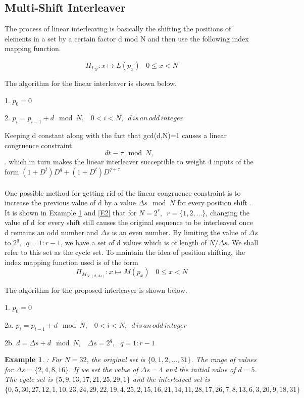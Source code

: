 \documentclass[20 pts]{article}
\newtheorem{example}[theorem]{Example}
\begin{document}
 \subsection{Multi-Shift Interleaver}
 The process of linear interleaving is basically the shifting the positions of elements in
 a set by a certain factor d mod N and then use the following index mapping function.
 
 $$\Pi_{\mathit{L}_{N}} : x \mapsto L(p_x)\,\,\,\,\, 0\leq x<N$$
 
 The algorithm for the linear interleaver is shown below.
  
   1. $p_0=0$
 
  2. $p_i=p_{i-1}+d \mod N,\,\,\,\,\, 0<i<N,\,\,\, \mathit{d \,is \,an \,odd \,integer}$
 
 
 Keeping d constant along with the fact that gcd(d,N)=1 causes a linear congruence
  constraint 
 $$ dt \equiv \tau \mod N, \,\,\,\, $$. which in turn makes the
  linear interleaver succeptible to weight 4 inputs of the form 
  $(1+D^t)D^q+(1+D^t)D^{q+\tau}$
  \paragraph{}
  One possible method for getting rid of the linear congruence constraint is to increase
  the previous value of d by a value $\Delta s \mod N$  for every position shift . 
  It is shown in Example \ref{E1} and \ref{E2}
   that for $N=2^r,\,\,\, r=\{1,2,...\}$, changing the value of d for every shift still 
   causes
   the original sequence to be interleaved once d remains an odd number and $\Delta s$
   is an even number. By limiting the value of $\Delta s$ to $2^q,\,\,\, q=1:r-1$, we 
   have a set of d values which is of length of $N/\Delta s$. We shall refer to this 
   set as the cycle set. To maintain the idea of position shifting, the index mapping
   function used is of the form 
   $$\Pi_{\mathit{M}_{N:(d,\Delta s)}} : x \mapsto M(p_x)\,\,\,\,\, 0\leq x<N$$
  
  The algorithm for the proposed interleaver is shown below.
  
   1. $p_0=0$
 
 2a. $p_i=p_{i-1}+d \mod N,\,\,\,\,\, 0<i<N,\,\,\, \mathit{d \,is \,an \,odd \,integer}$
 
 2b. $d=\Delta s +d \mod N, \,\,\,\,\, \Delta s =2^q, \,\,\,\, q=1:r-1$
 
 
 \begin{example}
 \label{E1}
 : For $N=32$, the original set is $\{0,1,2,...,31\}$. The range of values for 
 $\Delta s = \{ 2,4,8,16\}$.  If we set the value
 of $\Delta s = 4$ and the initial value of $d=5$. 
 The cycle set is $\{ 5,9,13,17,21,25,29,1\}$ and the interleaved set is 
$\{0,5,30,27,12,1,10,23,24,29,22,19, 4, 25 ,2,15 ,16,21,14,11, 28,17,
  26, 7, 8, 13, 6, 3, 20, 9, 18, 31\}$
 \end{example}
 
\end{document}
